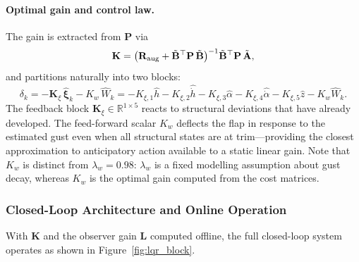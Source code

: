 \documentclass[11pt,a4paper]{article}
\newcommand{\vxi}{\bm{\xi}}
\newcommand{\mA}{\mathbf{A}}
\newcommand{\mB}{\mathbf{B}}
\newcommand{\mK}{\mathbf{K}}
\newcommand{\mP}{\mathbf{P}}
\newcommand{\mR}{\mathbf{R}}
\begin{document}
\paragraph{Optimal gain and control law.}
The gain is extracted from $\mP$ via
\begin{equation}
  \mK = \bigl(\mR_{\rm aug} + \tilde{\mB}^\top \mP\, \tilde{\mB}\bigr)^{-1}
        \tilde{\mB}^\top \mP\, \tilde{\mA},
  \label{eq:gain_formula}
\end{equation}
and partitions naturally into two blocks:
\begin{equation}
  \delta_k = -\mK_\xi\,\hat{\vxi}_k - K_w\,\hat{W}_k
  = -K_{\xi,1}\hat{h}
    - K_{\xi,2}\hat{\dot{h}}
    - K_{\xi,3}\hat{\alpha}
    - K_{\xi,4}\hat{\dot{\alpha}}
    - K_{\xi,5}\hat{z}
    - K_w\hat{W}_k.
  \label{eq:law_expanded}
\end{equation}
The feedback block $\mK_\xi \in \mathbb{R}^{1\times5}$ reacts to structural
deviations that have already developed.
The feed-forward scalar $K_w$ deflects the flap in response to the estimated
gust even when all structural states are at trim---providing the closest
approximation to anticipatory action available to a static linear gain.
Note that $K_w$ is distinct from $\lambda_w = 0.98$: $\lambda_w$ is a fixed
modelling assumption about gust decay, whereas $K_w$ is the optimal gain
computed from the cost matrices.

\subsubsection{Closed-Loop Architecture and Online Operation}
\label{sec:lqr_arch}

With $\mK$ and the observer gain $\mathbf{L}$ computed offline, the full
closed-loop system operates as shown in Figure~\ref{fig:lqr_block}.
\end{document}
